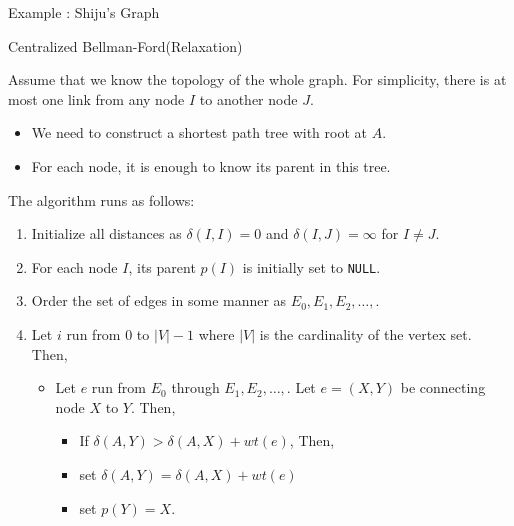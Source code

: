 \begin{frame}{Example : Shiju's Graph}
\end{frame}

\begin{frame}{Centralized Bellman-Ford(Relaxation)}

Assume that we know the topology of the whole graph. For simplicity, there is at most one link from any node $I$ to another node $J$.

\begin{itemize}
\item We need to construct a shortest path tree with root at $A$.
\item For each node, it is enough to know its parent in this tree.
\end{itemize}
The algorithm runs as follows:
\begin{enumerate}
\item Initialize all distances as $\delta (I,I) =0$ and $\delta (I,J) = \infty$ for $I\neq J$.
\item For each node $I$, its parent $p(I)$ is initially set to \texttt{NULL}.
\item Order the set of edges in some manner as $E_0, E_1, E_2, \ldots , $.
\item Let $i$ run from $0$ to $|V| -1$ where $|V|$ is the cardinality of the vertex set. Then,
\begin{itemize}
\item Let $e$ run from $E_0$ through $E_1, E_2, \ldots,$. Let $e = (X,Y)$ be connecting node $X$ to $Y$. Then, 
\begin{itemize}
\item[] If $\delta (A, Y) > \delta (A,X) + wt(e)$, Then,
\item[] \qquad set $\delta (A,Y)= \delta (A,X)+wt(e)$ 
\item[] \qquad set $p(Y) = X$.
\end{itemize} 
\end{itemize}
\end{enumerate}

\end{frame}

